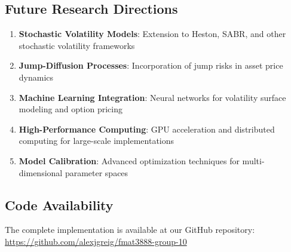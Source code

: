 \documentclass[11pt,a4paper]{article}
\begin{document}
\subsection{Future Research Directions}

\begin{enumerate}
\item \textbf{Stochastic Volatility Models}: Extension to Heston, SABR, and other stochastic volatility frameworks
\item \textbf{Jump-Diffusion Processes}: Incorporation of jump risks in asset price dynamics
\item \textbf{Machine Learning Integration}: Neural networks for volatility surface modeling and option pricing
\item \textbf{High-Performance Computing}: GPU acceleration and distributed computing for large-scale implementations
\item \textbf{Model Calibration}: Advanced optimization techniques for multi-dimensional parameter spaces
\end{enumerate}

\subsection{Code Availability}

The complete implementation is available at our GitHub repository: \url{https://github.com/alexjgreig/fmat3888-group-10}



\end{document}

